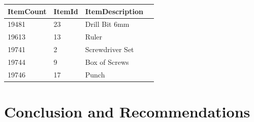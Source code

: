 \documentclass{article}
\begin{document}
                \begin{table}[H]
                    \centering
                    \begin{tabular}{|l|l|l|l|}
                    \hline
                    ItemCount & ItemId & ItemDescription \\ \hline
                    19481     & 23     & Drill Bit 6mm   \\ \hline
                    19613     & 13     & Ruler           \\ \hline
                    19741     & 2      & Screwdriver Set \\ \hline
                    19744     & 9      & Box of Screws   \\ \hline
                    19746     & 17     & Punch           \\ \hline
                    \end{tabular}
                    \end{table}

	\newpage
    \section{Conclusion and Recommendations}
\end{document}
